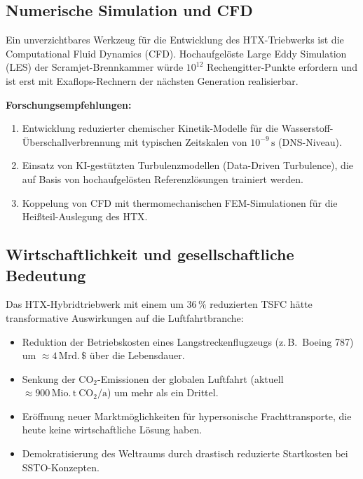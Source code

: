 ﻿\documentclass[12pt,a4paper]{article}
\theoremstyle{remark}
\begin{document}
\subsection{Numerische Simulation und CFD}

Ein unverzichtbares Werkzeug f\"ur die Entwicklung des HTX-Triebwerks
ist die Computational Fluid Dynamics (CFD).
Hochaufgel\"oste Large Eddy Simulation (LES) der Scramjet-Brennkammer
w\"urde $10^{12}$ Rechengitter-Punkte erfordern und ist erst mit
Exaflops-Rechnern der n\"achsten Generation realisierbar.

\textbf{Forschungsempfehlungen:}
\begin{enumerate}[label=(\arabic*)]
  \item Entwicklung reduzierter chemischer Kinetik-Modelle f\"ur die
        Wasserstoff-Über\-schallverbrennung mit typischen Zeitskalen
        von $10^{-9}\,\mathrm{s}$ (DNS-Niveau).
  \item Einsatz von KI-gestützten Turbulenzmodellen (Data-Driven Turbulence),
        die auf Basis von hochaufgel\"osten Referenzl\"osungen trainiert werden.
  \item Koppelung von CFD mit thermomechanischen FEM-Simulationen
        f\"ur die Heißteil-Auslegung des HTX.
\end{enumerate}

\subsection{Wirtschaftlichkeit und gesellschaftliche Bedeutung}

Das HTX-Hybridtriebwerk mit einem um $36\,\%$ reduzierten TSFC
h\"atte transformative Auswirkungen auf die Luftfahrtbranche:
\begin{itemize}
  \item Reduktion der Betriebskosten eines Langstreckenflugzeugs
        (z.\,B.\ Boeing 787) um $\approx 4\,\mathrm{Mrd.\,\$}$ \"uber die Lebensdauer.
  \item Senkung der CO$_2$-Emissionen der globalen Luftfahrt
        (aktuell $\approx 900\,\mathrm{Mio.\,t\ CO_2/a}$) um mehr als ein Drittel.
  \item Er\"offnung neuer Marktm\"oglichkeiten f\"ur hypersonische Frachttransporte,
        die heute keine wirtschaftliche L\"osung haben.
  \item Demokratisierung des Weltraums durch drastisch reduzierte
        Startkosten bei SSTO-Konzepten.
\end{itemize}
\end{document}
